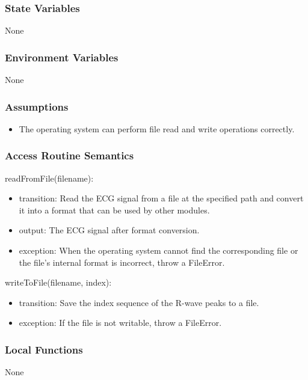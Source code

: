 \documentclass[12pt, titlepage]{article}
\begin{document}
\subsubsection{State Variables}

None

\subsubsection{Environment Variables}

None

\subsubsection{Assumptions}

\begin{itemize}
\item The operating system can perform file read and write operations correctly.
\end{itemize}

\subsubsection{Access Routine Semantics}

\noindent readFromFile(filename):
\begin{itemize}
\item transition: Read the ECG signal from a file at the specified path and
convert it into a format that can be used by other modules.
\item output: The ECG signal after format conversion.
\item exception: When the operating system cannot find the corresponding file or
the file's internal format is incorrect, throw a FileError.
\end{itemize}

\noindent writeToFile(filename, index):
\begin{itemize}
\item transition: Save the index sequence of the R-wave peaks to a file.
\item exception: If the file is not writable, throw a FileError.
\end{itemize}

\subsubsection{Local Functions}

None
\end{document}
